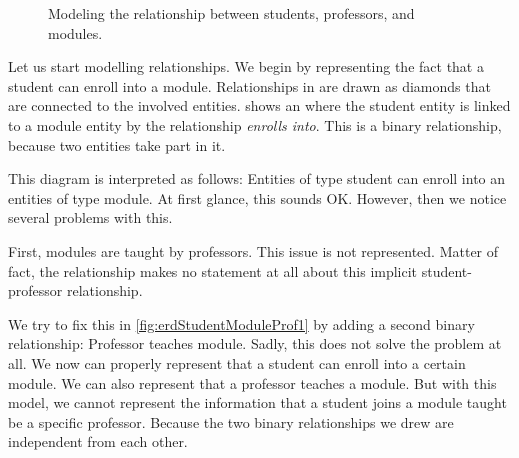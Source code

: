 \begin{figure}%
\centering%
%
%
%
\floatRowSep%
%
%
%
\floatRowSep%
%
%
%
\floatRowSep%
%
%
%
%
\caption{Modeling the relationship between students, professors, and modules.}%
\label{fig:erdStudentModuleProf}%
%
\end{figure}%
%
Let us start modelling relationships.
We begin by representing the fact that a student can enroll into a module.
Relationships in  are drawn as diamonds that are connected to the involved entities.
 shows an  where the student entity is linked to a module entity by the relationship \emph{enrolls into}.
This is a binary relationship, because two entities take part in it.

This diagram is interpreted as follows:
Entities of type student can enroll into an entities of type module.
At first glance, this sounds OK.
However, then we notice several problems with this.

First, modules are taught by professors.
This issue is not represented.
Matter of fact, the relationship makes no statement at all about this implicit student-professor relationship.

We try to fix this in \cref{fig:erdStudentModuleProf1} by adding a second binary relationship:
Professor teaches module.
Sadly, this does not solve the problem at all.
We now can properly represent that a student can enroll into a certain module.
We can also represent that a professor teaches a module.
But with this model, we cannot represent the information that a student joins a module taught be a specific professor.
Because the two binary relationships we drew are independent from each other.

